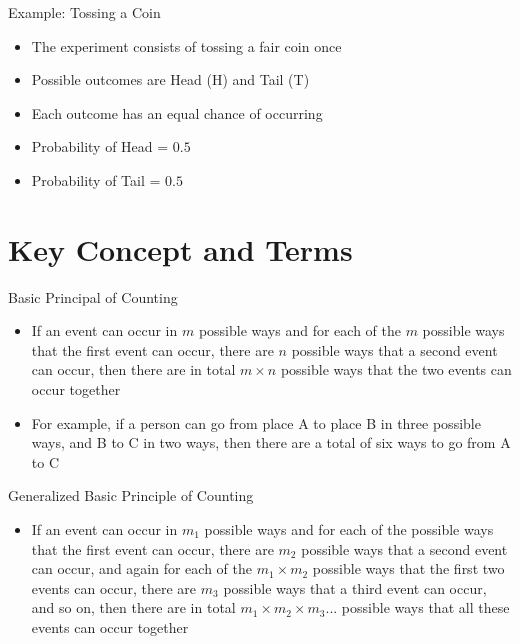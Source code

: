 \documentclass[12pt, aspectratio=169]{beamer}
\begin{document}
	\begin{frame}{Example: Tossing a Coin}
		\begin{itemize}
			\item The experiment consists of tossing a fair coin once
			\item Possible outcomes are Head (H) and Tail (T)
			\item Each outcome has an equal chance of occurring
			\item Probability of Head = $0.5$
			\item Probability of Tail = $0.5$
		\end{itemize}
	\end{frame}


	\section{Key Concept and Terms}

	\begin{frame}{Basic Principal of Counting}
		\begin{itemize}
			\item If an event can occur in $m$ possible ways and for each of the $m$ possible ways that the first event can occur, there are $n$ possible ways that a second event can occur, then there are in total $m \times n$ possible ways that the two events can occur together
			\item For example, if a person can go from place A to place B in three possible ways, and B to C in two ways, then there are a total of six ways to go from A to C
		\end{itemize}
	\end{frame}


	\begin{frame}{Generalized Basic Principle of Counting}
		\begin{itemize}
			\item If an event can occur in $𝑚_1$ possible ways and for each of the possible ways that the first event can occur, there are $𝑚_2$ possible ways that a second event can occur, and again for each of the $𝑚_1 \times 𝑚_2$ possible ways that the first two events can occur, there are $𝑚_3$ possible ways that a third event can occur, and so on, then there are in total $m_1 \times m_2 \times m_3...$ possible ways that all these events can occur together
		\end{itemize}
	\end{frame}
\end{document}

